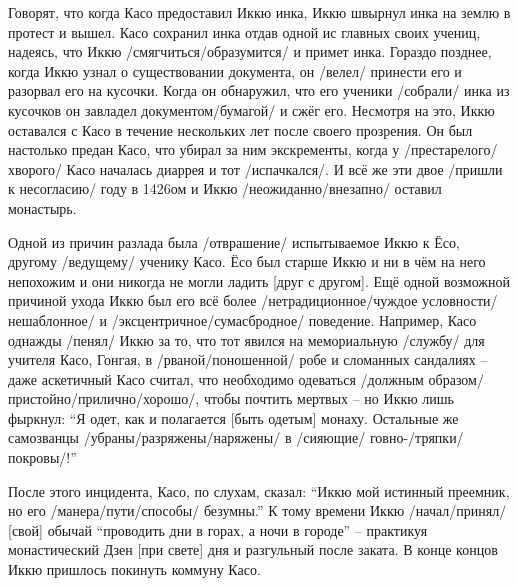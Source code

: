 \begin{ver}
Говорят, что когда Касо предоставил Иккю инка, Иккю швырнул инка на
землю в протест и вышел. Касо сохранил инка отдав одной ис главных
своих учениц, надеясь, что Иккю /смягчиться/образумится/ и примет
инка.
Гораздо позднее, когда Иккю узнал о существовании документа, он
/велел/ принести его и разорвал его на кусочки.
Когда он обнаружил, что его ученики /собрали/ инка из кусочков он
завладел документом/бумагой/ и сжёг его. Несмотря на это, Иккю
оставался с Касо в течение нескольких лет после своего прозрения.
Он был настолько предан Касо, что убирал за ним экскременты, когда
у /престарелого/хворого/ Касо началась диаррея и тот /испачкался/.
И всё же эти двое /пришли к несогласию/ году в 1426ом и Иккю
/неожиданно/внезапно/ оставил монастырь.
   
Одной из причин разлада была /отврашение/ испытываемое
Иккю к Ёсо, другому /ведущему/ ученику Касо. Ёсо был
старше Иккю и ни в чём на него непохожим и они никогда не могли ладить
[друг с другом]. Ещё одной возможной причиной ухода Иккю был его всё
более /нетрадиционное/чуждое
условности/нешаблонное/ и
/эксцентричное/сумасбродное/ поведение. Например, Касо
однажды /пенял/ Иккю за то, что тот явился на
мемориальную /службу/ для учителя Касо, Гонгая, в /рваной/поношенной/ робе и
сломанных сандалиях -- даже аскетичный Касо считал, что необходимо
одеваться /должным образом/пристойно/прилично/хорошо/, чтобы почтить
мертвых -- но Иккю лишь фыркнул: ``Я одет, как и полагается [быть одетым]
монаху. Остальные же самозванцы /убраны/разряжены/наряжены/ в
/сияющие/ говно-/тряпки/покровы/!''
\end{ver}

\begin{ver}
  После этого инцидента, Касо, по слухам, сказал: ``Иккю мой истинный
  преемник, но его /манера/пути/способы/ безумны.'' К тому времени
  Иккю /начал/принял/ [свой] обычай ``проводить дни в горах, а ночи в
  городе'' -- практикуя монастический Дзен [при свете] дня и
  разгульный после заката. В конце концов Иккю пришлось покинуть
  коммуну Касо.
\end{ver}
